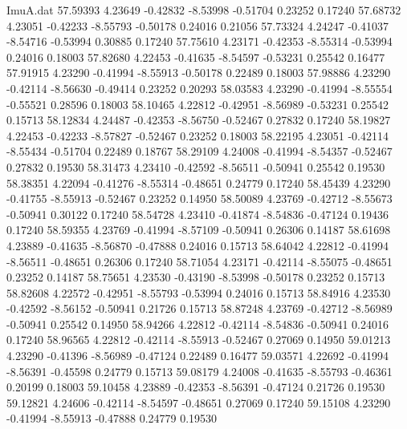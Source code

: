 \begin{filecontents}{ImuA.dat}
  57.59393    4.23649   -0.42832   -8.53998   -0.51704    0.23252    0.17240
  57.68732    4.23051   -0.42233   -8.55793   -0.50178    0.24016    0.21056
  57.73324    4.24247   -0.41037   -8.54716   -0.53994    0.30885    0.17240
  57.75610    4.23171   -0.42353   -8.55314   -0.53994    0.24016    0.18003
  57.82680    4.22453   -0.41635   -8.54597   -0.53231    0.25542    0.16477
  57.91915    4.23290   -0.41994   -8.55913   -0.50178    0.22489    0.18003
  57.98886    4.23290   -0.42114   -8.56630   -0.49414    0.23252    0.20293
  58.03583    4.23290   -0.41994   -8.55554   -0.55521    0.28596    0.18003
  58.10465    4.22812   -0.42951   -8.56989   -0.53231    0.25542    0.15713
  58.12834    4.24487   -0.42353   -8.56750   -0.52467    0.27832    0.17240
  58.19827    4.22453   -0.42233   -8.57827   -0.52467    0.23252    0.18003
  58.22195    4.23051   -0.42114   -8.55434   -0.51704    0.22489    0.18767
  58.29109    4.24008   -0.41994   -8.54357   -0.52467    0.27832    0.19530
  58.31473    4.23410   -0.42592   -8.56511   -0.50941    0.25542    0.19530
  58.38351    4.22094   -0.41276   -8.55314   -0.48651    0.24779    0.17240
  58.45439    4.23290   -0.41755   -8.55913   -0.52467    0.23252    0.14950
  58.50089    4.23769   -0.42712   -8.55673   -0.50941    0.30122    0.17240
  58.54728    4.23410   -0.41874   -8.54836   -0.47124    0.19436    0.17240
  58.59355    4.23769   -0.41994   -8.57109   -0.50941    0.26306    0.14187
  58.61698    4.23889   -0.41635   -8.56870   -0.47888    0.24016    0.15713
  58.64042    4.22812   -0.41994   -8.56511   -0.48651    0.26306    0.17240
  58.71054    4.23171   -0.42114   -8.55075   -0.48651    0.23252    0.14187
  58.75651    4.23530   -0.43190   -8.53998   -0.50178    0.23252    0.15713
  58.82608    4.22572   -0.42951   -8.55793   -0.53994    0.24016    0.15713
  58.84916    4.23530   -0.42592   -8.56152   -0.50941    0.21726    0.15713
  58.87248    4.23769   -0.42712   -8.56989   -0.50941    0.25542    0.14950
  58.94266    4.22812   -0.42114   -8.54836   -0.50941    0.24016    0.17240
  58.96565    4.22812   -0.42114   -8.55913   -0.52467    0.27069    0.14950
  59.01213    4.23290   -0.41396   -8.56989   -0.47124    0.22489    0.16477
  59.03571    4.22692   -0.41994   -8.56391   -0.45598    0.24779    0.15713
  59.08179    4.24008   -0.41635   -8.55793   -0.46361    0.20199    0.18003
  59.10458    4.23889   -0.42353   -8.56391   -0.47124    0.21726    0.19530
  59.12821    4.24606   -0.42114   -8.54597   -0.48651    0.27069    0.17240
  59.15108    4.23290   -0.41994   -8.55913   -0.47888    0.24779    0.19530

\end{filecontents}
